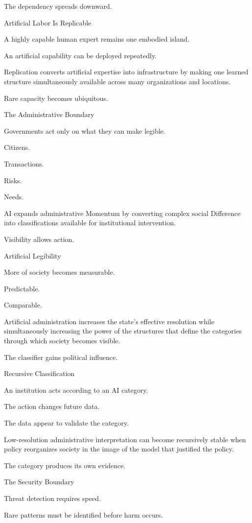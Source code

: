 The dependency spreads downward.

Artificial Labor Is Replicable

A highly capable human expert remains one embodied island.

An artificial capability can be deployed repeatedly.

Replication converts artificial expertise into infrastructure by making one learned structure simultaneously available across many organizations and locations.

Rare capacity becomes ubiquitous.

The Administrative Boundary

Governments act only on what they can make legible.

Citizens.

Transactions.

Risks.

Needs.

AI expands administrative Momentum by converting complex social Difference into classifications available for institutional intervention.

Visibility allows action.

Artificial Legibility

More of society becomes measurable.

Predictable.

Comparable.

Artificial administration increases the state’s effective resolution while simultaneously increasing the power of the structures that define the categories through which society becomes visible.

The classifier gains political influence.

Recursive Classification

An institution acts according to an AI category.

The action changes future data.

The data appear to validate the category.

Low-resolution administrative interpretation can become recursively stable when policy reorganizes society in the image of the model that justified the policy.

The category produces its own evidence.

The Security Boundary

Threat detection requires speed.

Rare patterns must be identified before harm occurs.

